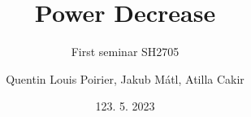 

\title[APROS simulations of BWR transients]{Power Decrease}
\subtitle{First seminar SH2705}
\author{Quentin Louis Poirier, Jakub Mátl, Atilla Cakir}
\date[24/05/23]{123. 5. 2023}
\usepackage{comment}

\usepackage[style=authoryear-ibid,backend=biber]{biblatex}
\usepackage{pgfplots}
\pgfplotsset{compat=1.18}



\nologo %




\frame{\titlepage}


